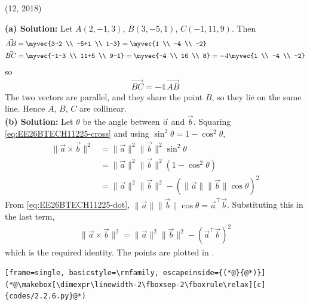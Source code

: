 \begin{enumerate}[label=\thesubsection.\arabic*, ref=\thesubsection.\theenumi]
\par\hfill (12, 2018)\par
\textbf{(a) Solution:} Let $A(2,-1,3)$, $B(3,-5,1)$, $C(-1,11,9)$. Then
\begin{align*}
    \vec{AB} &= \myvec{3-2 \\ -5+1 \\ 1-3} = \myvec{1 \\ -4 \\ -2} \\
    \vec{BC} &= \myvec{-1-3 \\ 11+5 \\ 9-1} = \myvec{-4 \\ 16 \\ 8} = -4\myvec{1 \\ -4 \\ -2}
\end{align*}
so
\begin{align}
\vec{BC} = -4\,\vec{AB}
\end{align}
The two vectors are parallel, and they share the point $B$, so they lie on the same line. Hence $A$, $B$, $C$ are collinear. \\[8pt]
\textbf{(b) Solution:} Let $\theta$ be the angle between $\vec{a}$ and $\vec{b}$. Squaring \eqref{eq:EE26BTECH11225-cross} and using $\sin^2\theta = 1 - \cos^2\theta$,
\begin{align*}
    \|\vec{a}\times\vec{b}\|^2 &= \|\vec{a}\|^2\|\vec{b}\|^2\sin^2\theta \\
    &= \|\vec{a}\|^2\|\vec{b}\|^2\left(1-\cos^2\theta\right) \\
    &= \|\vec{a}\|^2\|\vec{b}\|^2 - \left(\|\vec{a}\|\|\vec{b}\|\cos\theta\right)^2
\end{align*}
From \eqref{eq:EE26BTECH11225-dot}, $\|\vec{a}\|\|\vec{b}\|\cos\theta = \vec{a}^{\top}\vec{b}$. Substituting this in the last term,
\begin{align}
    \|\vec{a}\times\vec{b}\|^2 = \|\vec{a}\|^2\|\vec{b}\|^2 - \left(\vec{a}^{\top}\vec{b}\right)^2
\end{align}
which is the required identity. The points are plotted in .
\begin{lstlisting}[frame=single, basicstyle=\rmfamily, escapeinside={(*@}{@*)}]
(*@\makebox[\dimexpr\linewidth-2\fboxsep-2\fboxrule\relax][c]{codes/2.2.6.py}@*)
\end{lstlisting}

\end{enumerate}
